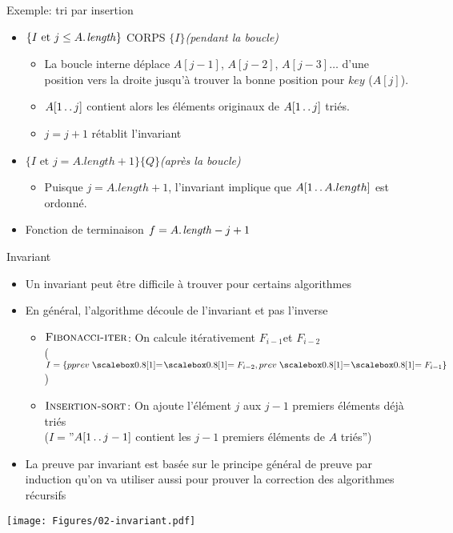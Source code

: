 \begin{frame}{Exemple: tri par insertion}
\begin{itemize}
\item $\{I\mbox{ et }j\leq \attrib{A}{length}\}$ CORPS $\{I\}$\hfill{\it(pendant la boucle)}
\begin{itemize}
\item La boucle interne déplace $A[j-1]$, $A[j-2]$, $A[j-3]\ldots$ d'une position vers la droite jusqu'à trouver la bonne position pour $key$ ($A[j]$).
\item $A[1\mathinner{\ldotp\ldotp} j]$ contient alors les éléments originaux de $A[1\mathinner{\ldotp\ldotp} j]$ triés.
\item $j=j+1$ rétablit l'invariant
\end{itemize}

\item $\{I\mbox{ et }j=A.length+1\}\{Q\}$\hfill{\it(après la boucle)}
\begin{itemize}
\item Puisque $j=A.length+1$, l'invariant implique que $A[1\mathinner{\ldotp\ldotp} A.length]$ est ordonné.
\end{itemize}

\bigskip

\item Fonction de terminaison $f=\attrib{A}{length}-j+1$
\end{itemize}
\end{frame}

\begin{frame}{Invariant}
\begin{itemize}
\item Un invariant peut être difficile à trouver pour certains algorithmes
\item En général, l'algorithme découle de l'invariant et pas l'inverse
\begin{itemize}
\item $\textnormal{\scshape Fibonacci-iter}$: On calcule itérativement $F_{i-1}$et $F_{i-2}$\\ ($I=\{pprev\isequal F_{i-2}, prev\isequal F_{i-1}\}$)
\item $\textnormal{\scshape Insertion-sort}$: On ajoute l'élément $j$ aux $j-1$ premiers éléments déjà triés\\ ($I=$''$A[1\mathinner{\ldotp\ldotp} j-1]$ contient les $j-1$ premiers éléments de $A$ triés'')
\end{itemize}

\bigskip

\item La preuve par invariant est basée sur le principe général de preuve par induction qu'on va utiliser aussi pour prouver la correction des algorithmes récursifs
\end{itemize}

\centerline{\texttt{[image: Figures/02-invariant.pdf]}}

\end{frame}

